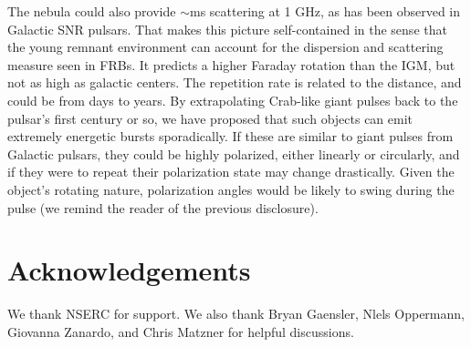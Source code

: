 \documentclass[useAMS,usenatbib]{mn2e}
\begin{document}
The nebula could also provide $\sim$ms scattering at 1 GHz, as has been 
observed in Galactic SNR pulsars. 
That makes this picture self-contained in the sense that
the young remnant environment can account for the dispersion 
and scattering measure seen in FRBs.  It predicts a higher Faraday
rotation than the IGM, but not as high as galactic centers.  The
repetition rate is related to the distance, and could be from days to
years.  
By extrapolating Crab-like giant pulses back to the pulsar's first century or so,
we have proposed that such objects can emit extremely energetic bursts sporadically. 
If these are similar to giant pulses from Galactic pulsars, they could be highly polarized, 
either linearly or circularly, and if they were to repeat their polarization state may 
change drastically. Given the object's rotating nature, polarization
 angles would be likely to swing during the pulse (we
remind the reader of the previous disclosure).
\\




\section{Acknowledgements}

We thank NSERC for support. We also thank Bryan Gaensler, Nlels Oppermann, 
Giovanna Zanardo, and Chris Matzner for helpful discussions. 

\newcommand{\araa}{ARA\&A}   %
\newcommand{\afz}{Afz}       %
\newcommand{\aj}{AJ}         %
\newcommand{\azh}{AZh}       %
\newcommand{\aaa}{A\&A}      %
\newcommand{\aas}{A\&AS}     %
\newcommand{\aar}{A\&AR}     %
\newcommand{\apj}{ApJ}       %
\newcommand{\apjs}{ApJS}     %
\newcommand{\apjl}{ApJ}      %
\newcommand{\apss}{Ap\&SS}   %
\newcommand{\baas}{BAAS}     %
\newcommand{\jaa}{JA\&A}     %
\newcommand{\mnras}{MNRAS}   %
\newcommand{\nat}{Nat}       %
\newcommand{\pasj}{PASJ}     %
\newcommand{\pasp}{PASP}     %
\newcommand{\paspc}{PASPC}   %
\newcommand{\qjras}{QJRAS}   %
\newcommand{\sci}{Sci}       %
\newcommand{\solphys}{Solar Physics}       %
\newcommand{\sova}{SvA}      %
\newcommand{\aap}{A\&A}
\newcommand\jcap{{J. Cosmology Astropart. Phys.}}%
\newcommand{\prd}{Phys. Rev. D}

%




\label{lastpage}
\end{document}
